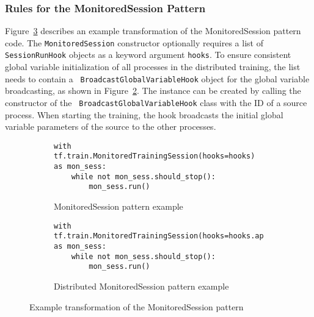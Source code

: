 \subsubsection{Rules for the MonitoredSession Pattern}
Figure~\ref{fig:trans:monsesstrans} describes an example transformation of the
MonitoredSession pattern code.
The {\tt MonitoredSession} constructor optionally requires a list of {\tt
SessionRunHook} objects as a keyword argument {\tt hooks}.
To ensure consistent global variable initialization of all processes in the
distributed training, the list needs to contain a {\tt
BroadcastGlobalVariableHook} object for the global variable broadcasting, as
shown in Figure~\ref{fig:trans:monsesstrans:b}.
The instance can be created by calling the constructor of the {\tt
BroadcastGlobalVariableHook} class with the ID of a source process.  
When starting the training, the hook broadcasts the initial global variable
parameters of the source to the other processes.\\

\begin{figure}
  \centering
  \begin{subfigure}[t]{0.8\textwidth}
    \begin{lstlisting}[style=mpython]
with tf.train.MonitoredTrainingSession(hooks=hooks) as mon_sess:
    while not mon_sess.should_stop():
        mon_sess.run()\end{lstlisting}
    \caption{MonitoredSession pattern example}
    \label{fig:trans:monsesstrans:a}
  \end{subfigure}
  \hspace{5mm}
  \begin{subfigure}[t]{0.8\textwidth}
    \begin{lstlisting}[style=mpython]
with tf.train.MonitoredTrainingSession(hooks=hooks.append(hvd.BroadcastGlobalVariablesHook(0)) as mon_sess:
    while not mon_sess.should_stop():
        mon_sess.run()\end{lstlisting}
    \caption{Distributed MonitoredSession pattern example}
    \label{fig:trans:monsesstrans:b}
  \end{subfigure}
  \caption{Example transformation of the MonitoredSession pattern}
  \label{fig:trans:monsesstrans}
\end{figure}


\vspace{-1em}

